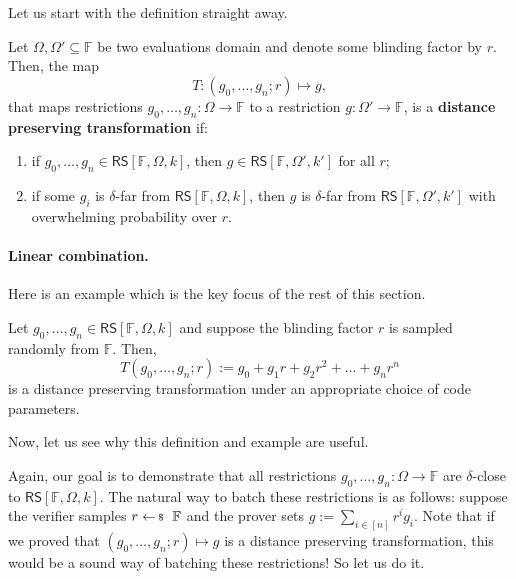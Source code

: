 \documentclass[../../book]{subfiles}
\begin{document}
Let us start with the definition straight away.

\begin{definition}\label{def:distance-preserving-transformation}
    Let $\Omega,\Omega' \subseteq \mathbb{F}$ be two evaluations domain and denote some blinding factor by $r$. Then, the map
    \begin{equation*}
        T: (g_0,\dots,g_n;r) \mapsto g,
    \end{equation*}
    that maps restrictions $g_0,\dots,g_n: \Omega \to \mathbb{F}$ to a restriction 
    $g: \Omega' \to \mathbb{F}$, is a \textbf{distance preserving transformation}
    if:
    \begin{enumerate}
        \item if $g_0,\dots,g_n \in \mathsf{RS}[\mathbb{F},\Omega,k]$, then $g \in \mathsf{RS}[\mathbb{F},\Omega',k']$ for all $r$;
        \item if some $g_i$ is $\delta$-far from $\mathsf{RS}[\mathbb{F},\Omega,k]$, then $g$ is $\delta$-far from $\mathsf{RS}[\mathbb{F},\Omega',k']$ with overwhelming probability over $r$.
    \end{enumerate}
\end{definition}

\paragraph{Linear combination.} Here is an example which is the key focus of the rest of this section.
\begin{example}
    Let $g_0,\dots,g_n \in \mathsf{RS}[\mathbb{F},\Omega,k]$ and suppose the blinding factor $r$ is sampled randomly from $\mathbb{F}$.
    Then,
    \begin{equation*}
        T(g_0,\dots,g_n;r) := g_0 + g_1r + g_2r^2 + \dots + g_nr^n
    \end{equation*}
    is a distance preserving transformation under an appropriate choice of code parameters.
\end{example}

Now, let us see why this definition and example are useful.

Again, our goal is to demonstrate that all restrictions $g_0,\dots,g_n: \Omega \to \mathbb{F}$ are $\delta$-close to $\mathsf{RS}[\mathbb{F},\Omega,k]$.
The natural way to batch these restrictions is as follows: suppose the verifier samples $r \leftarrowS \mathbb{F}$ and the prover sets \textcolor{oc-blue-8}{$g := \sum_{i \in [n]} r^ig_i$}. 
Note that if we proved that $(g_0,\dots,g_n;r) \mapsto g$ is a distance preserving transformation, this would be a sound way of batching these restrictions! So let us do it.
\end{document}
